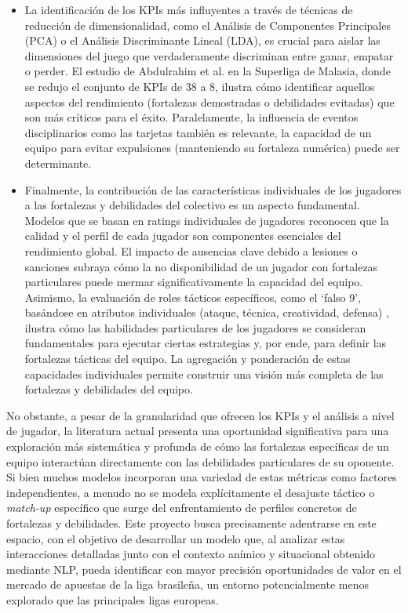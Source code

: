 \begin{itemize}
    \item La identificación de los KPIs más influyentes a través de técnicas de reducción de dimensionalidad, como el Análisis de Componentes Principales (PCA) o el Análisis Discriminante Lineal (LDA), es crucial para aislar las dimensiones del juego que verdaderamente discriminan entre ganar, empatar o perder. El estudio de Abdulrahim et al. \cite{abdulrahimDeterminationEssentialPerformance2023} en la Superliga de Malasia, donde se redujo el conjunto de KPIs de 38 a 8, ilustra cómo identificar aquellos aspectos del rendimiento (fortalezas demostradas o debilidades evitadas) que son más críticos para el éxito. Paralelamente, la influencia de eventos disciplinarios como las tarjetas \cite{badiellaInfluenceRedYellow2023} también es relevante, la capacidad de un equipo para evitar expulsiones (manteniendo su fortaleza numérica) puede ser determinante.
    \item Finalmente, la contribución de las características individuales de los jugadores a las fortalezas y debilidades del colectivo es un aspecto fundamental. Modelos que se basan en ratings individuales de jugadores \cite{holmesForecastingFootballMatch2024, yeungFrameworkInterpretableMatch2023} reconocen que la calidad y el perfil de cada jugador son componentes esenciales del rendimiento global. El impacto de ausencias clave debido a lesiones o sanciones \cite{zhangModelingPredictingOutcomes2021} subraya cómo la no disponibilidad de un jugador con fortalezas particulares puede mermar significativamente la capacidad del equipo. Asimismo, la evaluación de roles tácticos específicos, como el `falso 9', basándose en atributos individuales (ataque, técnica, creatividad, defensa) \cite{oluwayomiEvaluationTeamsFalse2022}, ilustra cómo las habilidades particulares de los jugadores se consideran fundamentales para ejecutar ciertas estrategias y, por ende, para definir las fortalezas tácticas del equipo. La agregación y ponderación de estas capacidades individuales permite construir una visión más completa de las fortalezas y debilidades del equipo.
\end{itemize}
No obstante, a pesar de la granularidad que ofrecen los KPIs y el análisis a nivel de jugador, la literatura actual presenta una oportunidad significativa para una exploración más sistemática y profunda de cómo las fortalezas específicas de un equipo interactúan directamente con las debilidades particulares de su oponente. Si bien muchos modelos incorporan una variedad de estas métricas como factores independientes, a menudo no se modela explícitamente el desajuste táctico o \textit{match-up} específico que surge del enfrentamiento de perfiles concretos de fortalezas y debilidades. Este proyecto busca precisamente adentrarse en este espacio, con el objetivo de desarrollar un modelo que, al analizar estas interacciones detalladas junto con el contexto anímico y situacional obtenido mediante NLP, pueda identificar con mayor precisión oportunidades de valor en el mercado de apuestas de la liga brasileña, un entorno potencialmente menos explorado que las principales ligas europeas.
